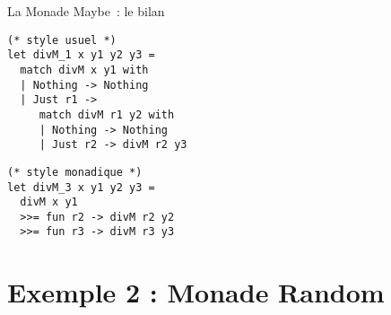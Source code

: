 \documentclass[10pt]{beamer}
\begin{document}
\begin{frame}[fragile]{La Monade Maybe~: le bilan}
  \begin{minipage}[c]{0.45\linewidth}
\begin{verbatim}
(* style usuel *)
let divM_1 x y1 y2 y3 =
  match divM x y1 with
  | Nothing -> Nothing
  | Just r1 ->
     match divM r1 y2 with
     | Nothing -> Nothing
     | Just r2 -> divM r2 y3
\end{verbatim}
  \end{minipage}
  \hfill
  \begin{minipage}[c]{0.45\linewidth}
\begin{verbatim}
(* style monadique *)
let divM_3 x y1 y2 y3 =
  divM x y1
  >>= fun r2 -> divM r2 y2
  >>= fun r3 -> divM r3 y3
\end{verbatim}
  \end{minipage}
\end{frame}

\section{Exemple 2 : Monade Random}
\end{document}

